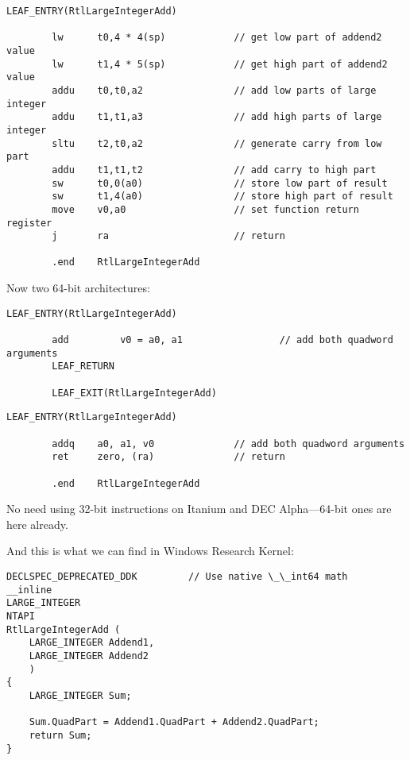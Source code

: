 \begin{lstlisting}[caption=MIPS arch]
        LEAF_ENTRY(RtlLargeIntegerAdd)

        lw      t0,4 * 4(sp)            // get low part of addend2 value
        lw      t1,4 * 5(sp)            // get high part of addend2 value
        addu    t0,t0,a2                // add low parts of large integer
        addu    t1,t1,a3                // add high parts of large integer
        sltu    t2,t0,a2                // generate carry from low part
        addu    t1,t1,t2                // add carry to high part
        sw      t0,0(a0)                // store low part of result
        sw      t1,4(a0)                // store high part of result
        move    v0,a0                   // set function return register
        j       ra                      // return

        .end    RtlLargeIntegerAdd
\end{lstlisting}

Now two 64-bit architectures:

\begin{lstlisting}[caption=Itanium arch]
        LEAF_ENTRY(RtlLargeIntegerAdd)

        add         v0 = a0, a1                 // add both quadword arguments
        LEAF_RETURN

        LEAF_EXIT(RtlLargeIntegerAdd)
\end{lstlisting}

\begin{lstlisting}[caption=DEC Alpha arch]
        LEAF_ENTRY(RtlLargeIntegerAdd)

        addq    a0, a1, v0              // add both quadword arguments
        ret     zero, (ra)              // return

        .end    RtlLargeIntegerAdd
\end{lstlisting}

No need using 32-bit instructions on Itanium and DEC Alpha---64-bit ones are here already.

And this is what we can find in Windows Research Kernel:

\begin{lstlisting}[style=customc]
DECLSPEC_DEPRECATED_DDK         // Use native \_\_int64 math
__inline
LARGE_INTEGER
NTAPI
RtlLargeIntegerAdd (
    LARGE_INTEGER Addend1,
    LARGE_INTEGER Addend2
    )
{
    LARGE_INTEGER Sum;

    Sum.QuadPart = Addend1.QuadPart + Addend2.QuadPart;
    return Sum;
}
\end{lstlisting}

